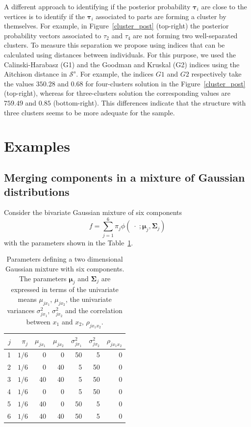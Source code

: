 \documentclass[submit]{smj}
\theoremstyle{definition}
\newcommand{\m}[1]{\boldsymbol{#1}}
\begin{document}
A different approach to identifying if the posterior probability $\m\tau_{i}$ are close to the vertices is to identify if the $\m\tau_{i}$ associated to parts are forming a cluster by themselves. For example, in Figure~\ref{cluster_post} (top-right) the posterior probability vectors associated to $\tau_2$ and $\tau_4$ are not forming two well-separated clusters. To measure this separation we propose using indices that can be calculated using distances between individuals. For this purpose, we used the Calinski-Harabasz (G1) and the Goodman and Kruskal (G2) indices \citep{milligan1985} using the Aitchison distance in $\mathcal{S}^s$. For example, the indices $G1$ and $G2$ respectively take the values $350.28$ and $0.68$ for four-clusters solution in the Figure~\ref{cluster_post} (top-right), whereas for three-clusters solution the corresponding values are $759.49$ and $0.85$ (bottom-right). This differences indicate that the structure with three clusters seems to be more adequate for the sample.

\section{Examples}\label{merging_examples_dist}

\subsection{Merging components in a mixture of Gaussian distributions}

Consider the bivariate Gaussian mixture of six components \citep{baudry2010combining}
\[
f= \sum_{j=1}^6 \pi_j \phi(\;\cdot\; ;  \m\mu_j, \m\Sigma_j)
\]
with the parameters shown in the Table~\ref{pars_table}. 

\begin{table}[htpb]
\caption{Parameters defining a two dimensional Gaussian mixture with six components. The parameters $\m\mu_j$ and $\m\Sigma_j$ are expressed in terms of the univariate means $\mu_{j x_1}$, $\mu_{j x_2}$, the univariate variances $\sigma^2_{j x_1}$, $\sigma^2_{j x_2}$ and the correlation between $x_1$ and $x_2$, $\rho_{j x_1 x_2}$.}
\centering
\begin{tabular}{rrrrrrr}
  \hline
$j$ & $\pi_j$ & $\mu_{j x_1}$ & $\mu_{j x_2}$ & $\sigma^2_{j x_1}$ & $\sigma^2_{j x_2}$ & $\rho_{j x_1 x_2}$ \\ 
  \hline
  1 &  $1/6$ &     0 &     0 &    50 &     5 &     0 \\ 
  2 &  $1/6$  &     0 &    40 &     5 &    50 &     0 \\ 
  3 &  $1/6$  &    40 &    40 &     5 &    50 &     0 \\ 
  4 &  $1/6$  &     0 &     0 &     5 &    50 &     0 \\ 
  5 &  $1/6$  &    40 &     0 &    50 &     5 &     0 \\ 
  6 &  $1/6$  &    40 &    40 &    50 &     5 &     0 \\ 
   \hline
\end{tabular}
\label{pars_table}
\end{table}
\end{document}
